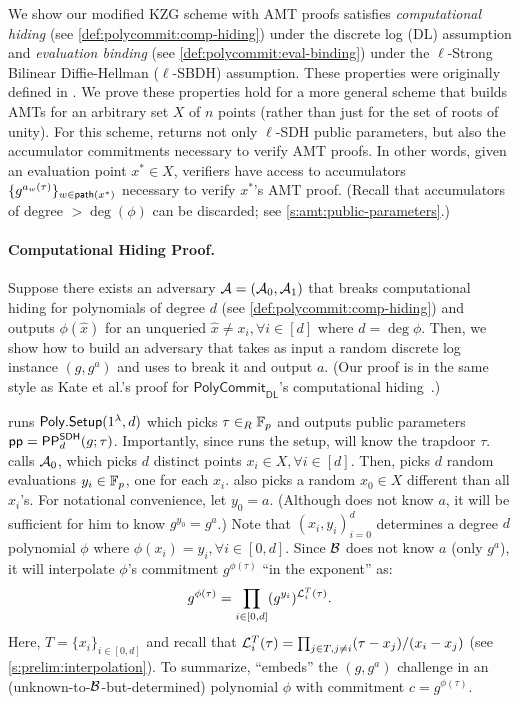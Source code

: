 We show our modified KZG scheme with AMT proofs satisfies \textit{computational hiding} (see \cref{def:polycommit:comp-hiding}) under the discrete log (DL) assumption and \textit{evaluation binding} (see \cref{def:polycommit:eval-binding}) under the $\ell$-Strong Bilinear Diffie-Hellman ($\ell$-SBDH) assumption.
These properties were originally defined in \cite{KZG10a}.
We prove these properties hold for a more general scheme that builds AMTs for an arbitrary set $X$ of $n$ points (rather than just for the set of roots of unity).
For this scheme, \polysetup returns not only $\ell$-SDH public parameters, but also the accumulator commitments necessary to verify AMT proofs.
In other words, given an evaluation point $x^{*} \in X$, verifiers have access to accumulators $\{g^{a_w(\tau)}\}_{w\in\mathsf{path}(x^{*})}$ necessary to verify $x^{*}$'s AMT proof.
(Recall that accumulators of degree $>\deg(\phi)$ can be discarded; see \cref{s:amt:public-parameters}.)

\paragraph{Computational Hiding Proof.}
Suppose there exists an adversary $\mathcal{A}=(\mathcal{A}_0,\mathcal{A}_1)$ that breaks computational hiding for polynomials of degree $d$ (see \cref{def:polycommit:comp-hiding}) and outputs $\phi(\hat{x})$ for an unqueried $\hat{x}\ne x_i, \forall i\in[d]$ where $d=\deg{\phi}$.
Then, we show how to build an adversary \AdvB that takes as input a random discrete log instance $(g, g^a)$ and uses \Adv to break it and output $a$.
(Our proof is in the same style as Kate et al.'s proof for $\mathsf{PolyCommit}_\mathsf{DL}$'s computational hiding~\cite{KZG10b}.)

\AdvB runs $\mathsf{Poly.Setup}(1^\lambda, d)$ which picks $\tau\in_R \mathbb{F}_p$ and outputs public parameters $\mathsf{pp}=\mathsf{PP}^\mathsf{SDH}_d(g;\tau)$.
Importantly, since \AdvB runs the setup, \AdvB will know the trapdoor $\tau$.
\AdvB calls $\mathcal{A}_0$, which picks $d$ distinct points $x_i\in X, \forall i\in[d]$.
Then, \AdvB picks $d$ random evaluations $y_i\in \mathbb{F}_p$, one for each $x_i$.
\AdvB also picks a random $x_0\in X$ different than all $x_i$'s.
For notational convenience, let $y_0 = a$.
(Although \AdvB does not know $a$, it will be sufficient for him to know $g^{y_0}=g^a$.)
Note that $(x_i, y_i)_{i=0}^d$ determines a degree $d$ polynomial $\phi$ where $\phi(x_i) = y_i,\forall i\in[0,d]$.
Since $\mathcal{B}$ does not know $a$ (only $g^a$), it will interpolate $\phi$'s commitment $g^{\phi(\tau)}$ ``in the exponent'' as:
$$g^{\phi(\tau)} = \prod_{i\in [0,d]} (g^{y_i})^{\mathcal{L}_i^{T}(\tau)}.$$
Here, $T=\{x_i\}_{i\in [0,d]}$ and recall that $\mathcal{L}_i^T(\tau)=\prod_{j\in T, j\ne i} (\tau-x_j)/(x_i-x_j)$ (see \cref{s:prelim:interpolation}).
To summarize, \AdvB ``embeds'' the $(g,g^a)$ challenge in an (unknown-to-$\mathcal{B}$-but-determined) polynomial $\phi$ with commitment $c=g^{\phi(\tau)}$.

